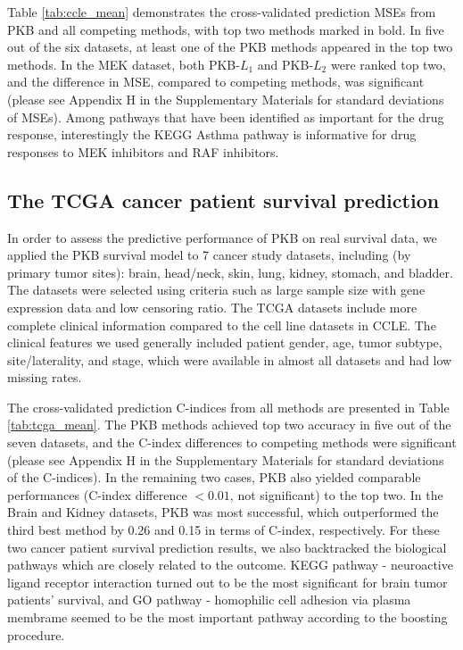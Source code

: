 \documentclass[a4paper,12pt]{article}
\begin{document}
Table \ref{tab:ccle_mean} demonstrates the cross-validated prediction MSEs from PKB and all competing methods, with top two methods marked in bold. In five out of the six datasets, at least one of the PKB methods appeared in the top two methods. In the MEK dataset, both PKB-$L_1$ and PKB-$L_2$ were ranked top two, and the difference in MSE, compared to competing methods, was significant (please see Appendix H in the Supplementary Materials for standard deviations of MSEs). Among pathways that have been identified as important for the drug response, interestingly the KEGG Asthma pathway is informative for drug responses to MEK inhibitors and RAF inhibitors.  


\subsection{The TCGA cancer patient survival prediction}

In order to assess the predictive performance of PKB on real survival data, we applied the PKB survival model to 7 cancer study datasets, including (by primary tumor sites): brain, head/neck, skin, lung, kidney, stomach, and bladder. The datasets were selected using criteria such as large sample size with gene expression data and low censoring ratio. The TCGA datasets include more complete clinical information compared to the cell line datasets in CCLE. The clinical features we used generally included patient gender, age, tumor subtype, site/laterality, and stage, which were available in almost all datasets and had low missing rates. 

The cross-validated prediction C-indices from all methods are presented in Table \ref{tab:tcga_mean}. The PKB methods achieved top two accuracy in five out of the seven datasets, and the C-index differences to competing methods were significant (please see Appendix H in the Supplementary Materials for standard deviations of the C-indices). In the remaining two cases, PKB also yielded comparable performances (C-index difference $< 0.01$, not significant) to the top two. In the Brain and Kidney datasets, PKB was most successful, which outperformed the third best method by 0.26 and 0.15 in terms of C-index, respectively. For these two cancer patient survival prediction results, we also backtracked the biological pathways which are closely related to the outcome. KEGG pathway - neuroactive ligand receptor interaction turned out to be the most significant for brain tumor patients' survival, and GO pathway - homophilic cell adhesion via plasma membrame seemed to be the most important pathway according to the boosting procedure. 
\end{document}
